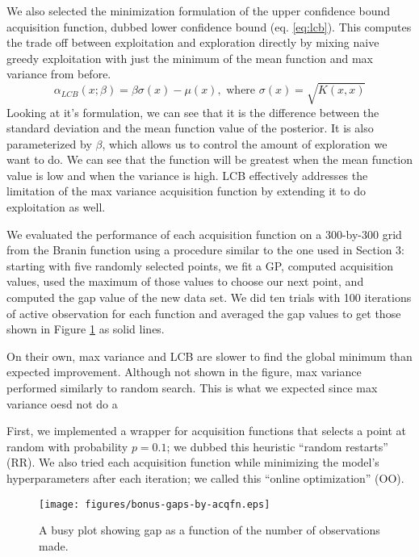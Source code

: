 \documentclass[11pt]{article}
\numberwithin{equation}{section}
\begin{document}
We also selected the minimization formulation of the upper confidence bound acquisition function, dubbed lower confidence bound (eq. \ref{eq:lcb}). This  computes the trade off between exploitation and exploration directly by mixing naive greedy exploitation with just the minimum of the mean function and max variance from before.
\begin{equation}
  \alpha_{LCB}(x; \beta) = \beta \sigma(x) - \mu(x), \text{ where } \sigma(x) = \sqrt{K(x, x)}
  \label{eq:lcb}
\end{equation}
Looking at it's formulation, we can see that it is the difference between the
standard deviation and the mean function value of the posterior. It is also
parameterized by $\beta$, which allows us to control the amount of
exploration we want to do. We can see that the function will be greatest when
the mean function value is low and when the variance is high. LCB effectively
addresses the limitation of the max variance acquisition function by
extending it to do exploitation as well.

We evaluated the performance of each acquisition function on a 300-by-300
grid from the Branin function using a procedure similar to the one used in
Section 3: starting with five randomly selected points, we fit a GP, computed
acquisition values, used the maximum of those values to choose our next
point, and computed the gap value of the new data set. We did ten trials with
100 iterations of active observation for each function and averaged the gap
values to get those shown in Figure \ref{fig:bonus-gaps} as solid lines.

On their own, max variance and LCB are slower to find the global minimum than expected improvement. Although not shown in the figure, max variance performed similarly to random search. This is what we expected since max variance  oesd not do a


First, we implemented a wrapper for acquisition functions that selects a point
at random with probability $p = 0.1$; we dubbed this heuristic ``random
restarts'' (RR). We also tried each acquisition function while minimizing the
model's hyperparameters after each iteration; we called this ``online
optimization'' (OO).

\begin{figure}[H]
  \centering
  \texttt{[image: figures/bonus-gaps-by-acqfn.eps]}
  \caption{A busy plot showing gap as a function of the number of
  observations made.}
  \label{fig:bonus-gaps}
\end{figure}
\end{document}
